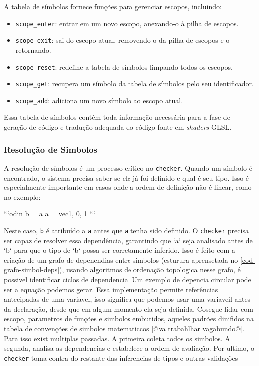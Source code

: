 A tabela de símbolos fornece funções para gerenciar escopos, incluindo:
\begin{itemize}
    \item \texttt{scope\_enter}: entrar em um novo escopo, anexando-o à pilha de escopos.
    \item \texttt{scope\_exit}: sai do escopo atual, removendo-o da pilha de escopos e o retornando.
    \item \texttt{scope\_reset}: redefine a tabela de símbolos limpando todos os escopos.
    \item \texttt{scope\_get}: recupera um símbolo da tabela de símbolos pelo seu identificador.
    \item \texttt{scope\_add}: adiciona um novo símbolo ao escopo atual.
\end{itemize}


Essa tabela de símbolos contém toda informação necessária para a fase de geração de código e tradução adequada do código-fonte em \textit{shaders} GLSL.

\subsubsection{Resolução de Simbolos}
A resolução de símbolos é um processo crítico no \verb`checker`. Quando um símbolo é encontrado, o sistema precisa saber se ele já foi definido e qual é seu tipo. Isso é especialmente importante em casos onde a ordem de definição não é linear, como no exemplo:

```odin
b = a
a = vec{1, 0, 1}
```

Neste caso, \verb`b` é atribuído a \verb`a` antes que \verb`a` tenha sido definido. O \verb`checker` precisa ser capaz de resolver essa dependência, garantindo que `a` seja analisado antes de `b` para que o tipo de `b` possa ser corretamente inferido.
Isso é feito com a criação de um grafo de depenendias entre simbolos (esturura aprensetada no \autoref{cod-grafo-simbol-deps}), usando algoritmos de ordenação topologica nesse grafo, é possivel identificar ciclos de dependencia, Um exemplo de depencia circular pode ser a equação  podemos gerar. Essa implementação permite referências antecipadas de uma variavel, isso significa que podemos usar uma variaveil antes da declaração, desde que em algum momento ela seja definida.
Cosegue lidar com escopo, parametros de funções e simbolos embutidos, aqueles padrões dinifidos na tabela de convenções de simbolos matematiccos \autoref{@va trabahlhar vagabundo@}. Para isso exist multiplas passadas. A primeira coleta todos os simbolos. A segunda, analisa as dependencias e estabelece a ordem de avaliação. Por ultimo, o \texttt{checker} toma contra do restante das inferencias de tipos e outras validações


